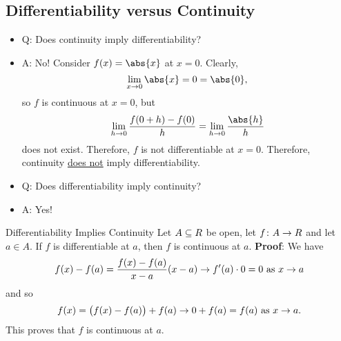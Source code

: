 \subsection{Differentiability versus Continuity}
\begin{itemize}
    \item Q\@: Does continuity imply differentiability?
    \item A\@: No! Consider $ f(x)=\abs{x} $ at $ x=0 $. Clearly,
          \[ \lim\limits_{{x} \to {0}}\abs{x}=0=\abs{0}, \]
          so $ f $ is continuous at $ x=0 $, but
          \[ \lim\limits_{{h} \to {0}}\frac{f(0+h)-f(0)}{h}=\lim\limits_{{h} \to {0}}\frac{\abs{h}}{h} \]
          does not exist. Therefore, $ f $ is not differentiable at $ x=0 $. Therefore,
          continuity \underline{does not} imply differentiability.
    \item Q\@: Does differentiability imply continuity?
    \item A\@: Yes!
\end{itemize}
\begin{Theorem}{Differentiability Implies Continuity}{}
    Let $ A\subseteq \relax{R} $ be open, let $ f\colon A\to\relax{R} $ and let $ a\in A $. If $ f $
    is differentiable at $ a $, then $ f $ is continuous at $ a $.
    \tcblower{}
    \textbf{Proof}: We have
    \[ f(x)-f(a)=\frac{f(x)-f(a)}{x-a}(x-a)\to f'(a)\cdot 0=0\text{ as $ x\to a $} \]
    and so
    \[ f(x)=\bigl(f(x)-f(a)\bigr)+f(a)\to 0+f(a)=f(a)\text{ as $ x\to a $}. \]
    This proves that $ f $ is continuous at $ a $.
\end{Theorem}